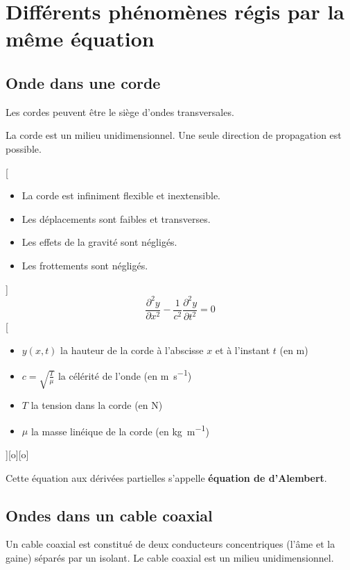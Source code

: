 \section{Différents phénomènes régis par la même équation}
\subsection{Onde dans une corde}
Les cordes peuvent être le siège d'ondes transversales.

La corde est un milieu unidimensionnel. Une seule direction de propagation est possible.


[\begin{itemize}
    \item La corde est infiniment flexible et inextensible.
    \item Les déplacements sont faibles et transverses.
    \item Les effets de la gravité sont négligés.
    \item Les frottements sont négligés.
\end{itemize}]
{
    $$\frac{\partial^2 y}{\partial x^2}-\frac{1}{c^2}\frac{\partial^2y}{\partial t^2}=0$$
}
[
    \begin{itemize}
        \item $y(x,t)$ la hauteur de la corde à l'abscisse $x$ et à l'instant $t$ (en \unit{m})
        \item $c=\sqrt{\frac{T}{\mu}}$ la célérité de l'onde (en \unit{m.s^{-1}})
        \item $T$ la tension dans la corde (en \unit{N})
        \item $\mu$ la masse linéique de la corde (en \unit{kg.m^{-1}})
    \end{itemize}
][o][o]


Cette équation aux dérivées partielles s'appelle \textbf{équation de d'Alembert}.

\subsection{Ondes dans un cable coaxial}
Un cable coaxial est constitué de deux conducteurs concentriques (l'âme et la gaine) séparés par un isolant. Le cable coaxial est un milieu unidimensionnel.

